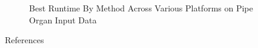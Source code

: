 \documentclass[final]{beamer}
\newlength{\sepwidth}
\newlength{\colwidth}
\newcommand{\separatorcolumn}{\begin{column}{\sepwidth}\end{column}}
\begin{document}
\begin{frame}[t]
\begin{columns}[t]
\begin{column}{\colwidth}
\begin{block}{}
\begin{figure}[h]
					\caption{Best Runtime By Method Across Various Platforms on Pipe Organ Input Data}
					\label{fig:pipeorganvariance}
				\end{figure}
			\end{block}

			\begin{block}{References}
				\footnotesize{\printbibliography}
			\end{block}
		\end{column}

		\separatorcolumn
	\end{columns}
\end{frame}
\end{document}
